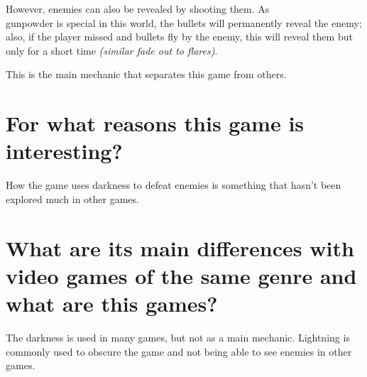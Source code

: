 However, enemies can also be revealed by shooting them. As \\gunpowder is special in this world, the bullets will permanently reveal the enemy; also, if the player missed and bullets fly by the enemy, this will reveal them but only for a short time \textit{(similar fade out to flares)}.

This is the main mechanic that separates this game from others.

\section{For what reasons this game is interesting?}
How the game uses darkness to defeat enemies is something that hasn't been explored much in other games.


\section{What are its main differences with video games of the same genre and what are this games?}
The darkness is used in many games, but not as a main mechanic. Lightning is commonly used to obscure the game and not being able to see enemies in other games.